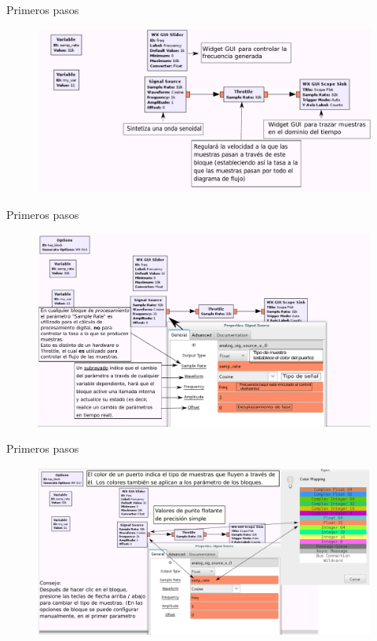 \begin{frame}{Primeros pasos}
\begin{figure}[H]
\centering
\includegraphics[width=\textwidth]{lab1/pdf/lab111.pdf}
\end{figure}
\end{frame}

\begin{frame}{Primeros pasos}
\begin{figure}[H]
\centering
\includegraphics[width=\textwidth]{lab1/pdf/lab112.pdf}
\end{figure}
\end{frame}

\begin{frame}{Primeros pasos}
\begin{figure}[H]
\centering
\includegraphics[width=\textwidth]{lab1/pdf/lab113.pdf}
\end{figure}
\end{frame}

